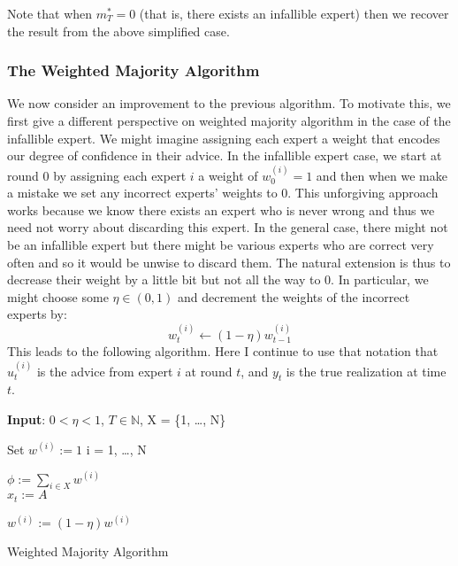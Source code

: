 \documentclass[12pt]{article}
\begin{document}
Note that when $m_T^* = 0$ (that is, there exists an infallible expert) then we recover the result from the above simplified case. 


\subsubsection{The Weighted Majority Algorithm}
We now consider an improvement to the previous algorithm. To motivate this, we first give a different perspective on weighted majority algorithm in the case of the infallible expert.
We might imagine assigning each expert a weight that encodes our degree of confidence in their advice. In the infallible expert case, we start at round $0$ by assigning each expert
$i$ a weight of $w^{(i)}_0 = 1$ and then when we make a mistake we set any incorrect experts' weights to $0$. This unforgiving approach works because we know there exists an expert who is never wrong and
thus we need not worry about discarding this expert. In the general case, there might not be an infallible expert but there might be various experts who are correct very often and so it would be unwise 
to discard them. The natural extension is thus to decrease their weight by a little bit but not all the way to $0$. In particular, we might choose some $\eta \in (0, 1)$ and decrement the weights of the incorrect
experts by: 
\[w^{(i)}_{t} \gets (1 - \eta) w^{(i)}_{t - 1}\]
This leads to the following algorithm. Here I continue to use that notation that $u_t^{(i)}$ is the advice from expert $i$ at round $t$, and $y_t$ is the true realization at time $t$.
\bigskip

 \begin{algorithm}[H]
	\SetAlgoLined
	
	\textbf{Input}: $0 < \eta < 1$, $T \in \mathbb{N}$,  X = \{1, \dots, N\} \\
	
	\bigskip
	
	Set $w^{(i)} := 1$  i = 1, \dots, N \\
	
	 {
		$\phi := \sum_{i \in X} w^{(i)}$ \\
		 {
			$x_t := A$
		} 
		
		 {
			 {
					$w^{(i)} := (1 - \eta)w^{(i)}$ \\
			}
		}
	}			
\caption{Weighted Majority Algorithm}
\end{algorithm}
\end{document}
